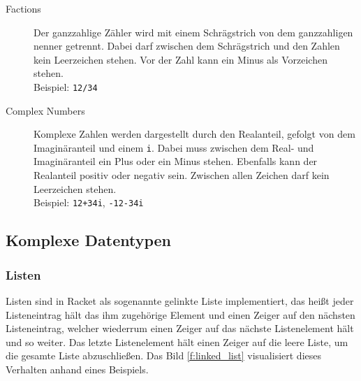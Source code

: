 \begin{description}
\begin{description}
                        \item[Factions] Der ganzzahlige Zähler wird mit einem Schrägstrich von dem ganzzahligen nenner getrennt. Dabei darf zwischen dem Schrägstrich und den Zahlen kein Leerzeichen stehen. Vor der Zahl kann ein Minus als Vorzeichen stehen. \\ Beispiel: \texttt{12/34}
                        \item[Complex Numbers] Komplexe Zahlen werden dargestellt durch den Realanteil, gefolgt von dem Imaginäranteil und einem \texttt{i}. Dabei muss zwischen dem Real- und Imaginäranteil ein Plus oder ein Minus stehen. Ebenfalls kann der Realanteil positiv oder negativ sein. Zwischen allen Zeichen darf kein Leerzeichen stehen. \\ Beispiel: \texttt{12+34i}, \texttt{-12-34i}
                    \end{description}
            \end{description}



    \subsection{Komplexe Datentypen}
        \subsubsection{Listen}
            Listen sind in Racket als sogenannte gelinkte Liste implementiert, das heißt jeder Listeneintrag hält das ihm zugehörige Element und einen Zeiger auf den nächsten Listeneintrag, welcher wiederrum einen Zeiger auf das nächste Listenelement hält und so weiter. Das letzte Listenelement hält einen Zeiger auf die leere Liste, um die gesamte Liste abzuschließen. Das Bild \ref{f:linked_list} visualisiert dieses Verhalten anhand eines Beispiels.


